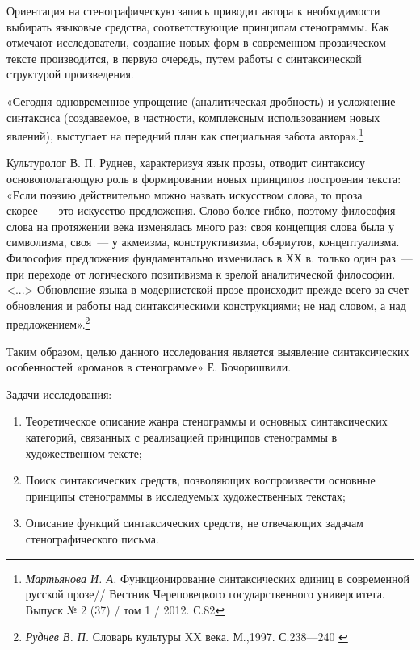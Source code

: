 \documentclass{kursa4}
\begin{document}
    Ориентация на стенографическую запись приводит автора к
    необходимости выбирать языковые средства, соответствующие принципам
    стенограммы. Как отмечают исследователи, создание новых форм в
    современном прозаическом тексте производится, в первую очередь, путем
    работы с синтаксической структурой произведения. 

    {«Сегодня одновременное упрощение (аналитическая
    дробность) и усложнение синтаксиса (создаваемое, в частности,
    комплексным использованием новых явлений), выступает на передний план
    как специальная забота
    автора».}\footnote{\textit{{Мартьянова И. А.
    }}{Функционирование синтаксических единиц в
    современной русской прозе// Вестник Череповецкого государственного
    университета. Выпуск № 2 (37) / том 1 / 2012. С.82}}

    {Культуролог В. П. Руднев, характеризуя язык прозы,
    отводит синтаксису основополагающую роль в формировании новых принципов
    построения текста: «Если поэзию действительно можно назвать
    искусством слова, то проза скорее~--- это искусство предложения. Слово
    более гибко, поэтому философия слова на протяжении века изменялась
    много раз: своя концепция слова была у символизма, своя~--- у акмеизма,
    конструктивизма, обэриутов, концептуализма. Философия предложения
    фундаментально изменилась в ХХ в. только один раз~--- при переходе от
    логического позитивизма к зрелой аналитической философии.
    \textless{}...\textgreater{} Обновление языка в модернистской прозе
    происходит прежде всего за счет обновления и работы над
    синтаксическими конструкциями; не над словом, а над
    предложением».}\footnote{\textit{{ Руднев В. П.
    }}{Словарь культуры XX века. М.,1997. С.238—240 }}

    {Таким образом, целью данного исследования является
    выявление синтаксических особенностей «романов в стенограмме» Е.
    Бочоришвили.}

    {Задачи исследования:}
    \begin{enumerate}
      \item Теоретическое описание жанра стенограммы и
      основных синтаксических категорий, связанных с реализацией принципов
      стенограммы в художественном тексте;
      \item Поиск синтаксических средств, позволяющих
      воспроизвести основные принципы стенограммы в исследуемых
      художественных текстах;
      \item Описание функций синтаксических средств, не
      отвечающих задачам стенографического письма.
    \end{enumerate}
\end{document}
